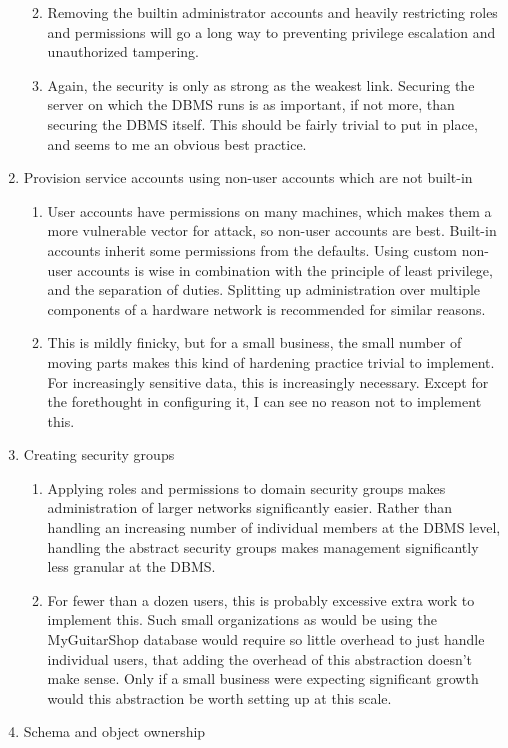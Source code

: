 \begin{enumerate}
  \begin{enumerate}
  \def\labelenumii{\arabic{enumii}.}
  \item
    Removing the builtin administrator accounts and heavily restricting
    roles and permissions will go a long way to preventing privilege
    escalation and unauthorized tampering.
  \item
    Again, the security is only as strong as the weakest link. Securing
    the server on which the DBMS runs is as important, if not more, than
    securing the DBMS itself. This should be fairly trivial to put in
    place, and seems to me an obvious best practice.
  \end{enumerate}
\item
  Provision service accounts using non-user accounts which are not
  built-in

  \begin{enumerate}
  \def\labelenumii{\arabic{enumii}.}
  \item
    User accounts have permissions on many machines, which makes them a
    more vulnerable vector for attack, so non-user accounts are best.
    Built-in accounts inherit some permissions from the defaults. Using
    custom non-user accounts is wise in combination with the principle
    of least privilege, and the separation of duties. Splitting up
    administration over multiple components of a hardware network is
    recommended for similar reasons.
  \item
    This is mildly finicky, but for a small business, the small number
    of moving parts makes this kind of hardening practice trivial to
    implement. For increasingly sensitive data, this is increasingly
    necessary. Except for the forethought in configuring it, I can see
    no reason not to implement this.
  \end{enumerate}
\item
  Creating security groups

  \begin{enumerate}
  \def\labelenumii{\arabic{enumii}.}
  \item
    Applying roles and permissions to domain security groups makes
    administration of larger networks significantly easier. Rather than
    handling an increasing number of individual members at the DBMS
    level, handling the abstract security groups makes management
    significantly less granular at the DBMS.
  \item
    For fewer than a dozen users, this is probably excessive extra work
    to implement this. Such small organizations as would be using the
    MyGuitarShop database would require so little overhead to just
    handle individual users, that adding the overhead of this
    abstraction doesn't make sense. Only if a small business were
    expecting significant growth would this abstraction be worth setting
    up at this scale.
  \end{enumerate}
\item
  Schema and object ownership


\end{enumerate}
